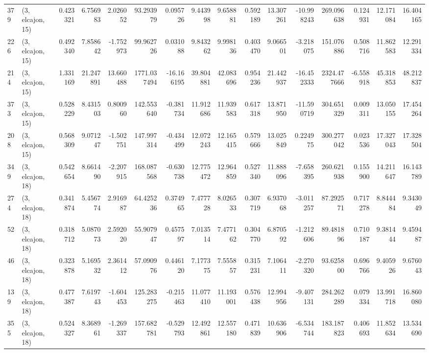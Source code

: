 \begin{tabular}{llrrrrrrrrrrrrrr}
379 &  (3, elcajon, 15) &   0.423321 &   6.756983 &   2.026052 &    93.293979 &   0.095726 &   9.443998 &   9.658881 &  0.592189 &  13.307261 & -10.998243 &   269.096638 &   0.124931 &  12.171084 &  16.404165 \\
226 &  (3, elcajon, 15) &   0.492340 &   7.858642 &  -1.752973 &    99.962726 &   0.031088 &   9.843262 &   9.998136 &  0.403470 &   9.066501 &  -3.218075 &   151.076886 &   0.508716 &  11.862583 &  12.291334 \\
214 &  (3, elcajon, 15) &   1.331169 &  21.247891 &  13.660488 &  1771.037494 & -16.166195 &  39.804881 &  42.083696 &  0.954236 &  21.442937 & -16.452333 &  2324.477666 &  -6.558918 &  45.318853 &  48.212837 \\
373 &  (3, elcajon, 15) &   0.528229 &   8.431503 &   0.800960 &   142.553640 &  -0.381734 &  11.912686 &  11.939583 &  0.617318 &  13.871950 & -11.590719 &   304.651329 &   0.009311 &  13.050155 &  17.454264 \\
208 &  (3, elcajon, 15) &   0.568309 &   9.071247 &  -1.502751 &   147.997314 &  -0.434499 &  12.072243 &  12.165415 &  0.579666 &  13.025849 &   0.224975 &   300.277042 &   0.023536 &  17.327043 &  17.328504 \\
349 &  (3, elcajon, 18) &   0.542654 &   8.661490 &  -2.207915 &   168.087568 &  -0.630738 &  12.775472 &  12.964859 &  0.527340 &  11.888096 &  -7.658395 &   260.621938 &   0.155900 &  14.211647 &  16.143789 \\
274 &  (3, elcajon, 18) &   0.341874 &   5.456774 &   2.916987 &    64.425236 &   0.374965 &   7.477728 &   8.026533 &  0.307719 &   6.937068 &  -3.011257 &    87.292571 &   0.717278 &   8.844484 &   9.343049 \\
52  &  (3, elcajon, 18) &   0.318712 &   5.087073 &   2.592020 &    55.907947 &   0.457597 &   7.013514 &   7.477162 &  0.304770 &   6.870592 &  -1.212606 &    89.481896 &   0.710187 &   9.381444 &   9.459487 \\
46  &  (3, elcajon, 18) &   0.323878 &   5.169532 &   2.361412 &    57.090976 &   0.446120 &   7.177375 &   7.555857 &  0.315231 &   7.106411 &  -2.270320 &    93.625800 &   0.696766 &   9.405926 &   9.676043 \\
139 &  (3, elcajon, 18) &   0.477387 &   7.619743 &  -1.604453 &   125.283275 &  -0.215463 &  11.077410 &  11.193001 &  0.576438 &  12.994956 &  -9.407131 &   284.262289 &   0.079334 &  13.991718 &  16.860080 \\
355 &  (3, elcajon, 18) &   0.524327 &   8.368961 &  -1.269337 &   157.682781 &  -0.529793 &  12.492861 &  12.557180 &  0.471839 &  10.636906 &  -6.534744 &   183.187823 &   0.406693 &  11.852634 &  13.534690 \\

\end{tabular}
